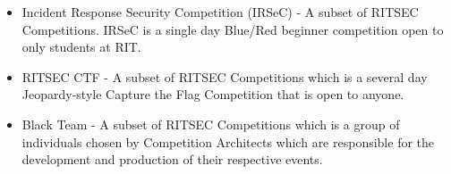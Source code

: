 \begin{itemize}
  \item Incident Response Security Competition (IRSeC) - A subset of RITSEC 
    Competitions. IRSeC is a single day Blue/Red 
    beginner competition open to only students at RIT.

  \item RITSEC CTF - A subset of RITSEC Competitions which is a several day
    Jeopardy-style Capture the Flag Competition that is open to anyone.
  
  \item Black Team - A subset of RITSEC Competitions which is a group of 
    individuals chosen by Competition Architects which are responsible for the
    development and production of their respective events.

\end{itemize}
